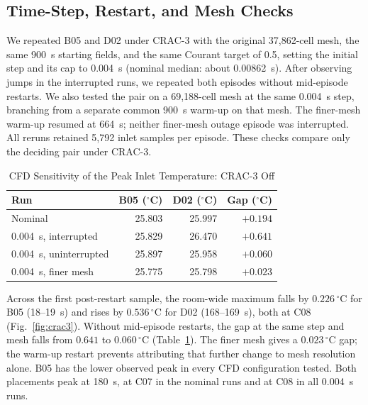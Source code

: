 \documentclass{ieeeaccess}
\begin{document}
\subsection{Time-Step, Restart, and Mesh Checks}
We repeated B05 and D02 under CRAC-3 with the original 37,862-cell mesh, the same 900~s starting fields, and the same Courant target of 0.5, setting the initial step and its cap to 0.004~s (nominal median: about 0.00862~s). After observing jumps in the interrupted runs, we repeated both episodes without mid-episode restarts. We also tested the pair on a 69,188-cell mesh at the same 0.004~s step, branching from a separate common 900~s warm-up on that mesh. The finer-mesh warm-up resumed at 664~s; neither finer-mesh outage episode was interrupted. All reruns retained 5,792 inlet samples per episode. These checks compare only the deciding pair under CRAC-3.

\begin{table}[t]
\caption{CFD Sensitivity of the Peak Inlet Temperature: CRAC-3 Off}
\label{tab:dt}
\centering
\begin{tabular}{@{}lrrr@{}}
\toprule
\textbf{Run} & \textbf{B05 ($^\circ$C)} & \textbf{D02 ($^\circ$C)} & \textbf{Gap ($^\circ$C)} \\
\midrule
Nominal & 25.803 & 25.997 & $+0.194$ \\
0.004~s, interrupted & 25.829 & 26.470 & $+0.641$ \\
0.004~s, uninterrupted & 25.897 & 25.958 & $+0.060$ \\
0.004~s, finer mesh & 25.775 & 25.798 & $+0.023$ \\
\bottomrule
\end{tabular}
\par{}
\end{table}

Across the first post-restart sample, the room-wide maximum falls by $0.226\,^{\circ}\mathrm{C}$ for B05 (18--19~s) and rises by $0.536\,^{\circ}\mathrm{C}$ for D02 (168--169~s), both at C08 (Fig.~\ref{fig:crac3}). Without mid-episode restarts, the gap at the same step and mesh falls from $0.641$ to $0.060\,^{\circ}\mathrm{C}$ (Table~\ref{tab:dt}). The finer mesh gives a $0.023\,^{\circ}\mathrm{C}$ gap; the warm-up restart prevents attributing that further change to mesh resolution alone. B05 has the lower observed peak in every CFD configuration tested. Both placements peak at 180~s, at C07 in the nominal runs and at C08 in all 0.004~s runs.
\end{document}
